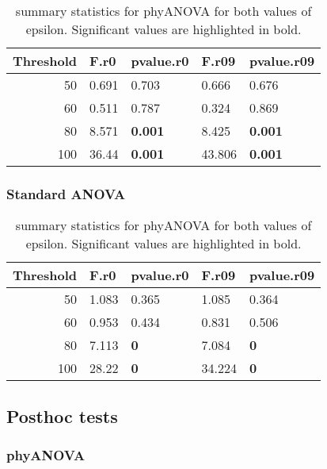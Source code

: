 \documentclass[]{article}
\begin{document}
\begin{table}[H]

\caption{\label{tab:unnamed-chunk-40}summary statistics for phyANOVA for both values of epsilon. Significant values are highlighted in bold.}
\centering
\begin{tabular}{r|l|l|l|l}
\hline
Threshold & F.r0 & pvalue.r0 & F.r09 & pvalue.r09\\
\hline
50 & 0.691 & 0.703 & 0.666 & 0.676\\
\hline
60 & 0.511 & 0.787 & 0.324 & 0.869\\
\hline
80 & 8.571 & \textbf{0.001} & 8.425 & \textbf{0.001}\\
\hline
100 & 36.44 & \textbf{0.001} & 43.806 & \textbf{0.001}\\
\hline
\end{tabular}
\end{table}

\hypertarget{standard-anova-6}{%
\subsubsection{Standard ANOVA}\label{standard-anova-6}}

\begin{table}[H]

\caption{\label{tab:unnamed-chunk-41}summary statistics for phyANOVA for both values of epsilon. Significant values are highlighted in bold.}
\centering
\begin{tabular}{r|l|l|l|l}
\hline
Threshold & F.r0 & pvalue.r0 & F.r09 & pvalue.r09\\
\hline
50 & 1.083 & 0.365 & 1.085 & 0.364\\
\hline
60 & 0.953 & 0.434 & 0.831 & 0.506\\
\hline
80 & 7.113 & \textbf{0} & 7.084 & \textbf{0}\\
\hline
100 & 28.22 & \textbf{0} & 34.224 & \textbf{0}\\
\hline
\end{tabular}
\end{table}

\hypertarget{posthoc-tests-3}{%
\subsection{Posthoc tests}\label{posthoc-tests-3}}

\hypertarget{phyanova-7}{%
\subsubsection{phyANOVA}\label{phyanova-7}}
\end{document}
